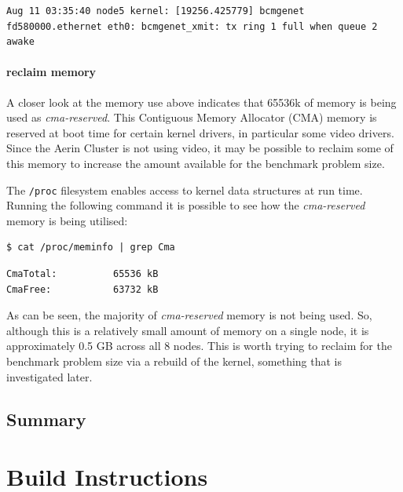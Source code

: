 \documentclass{report}
\begin{document}
\lstset{style=type}
\begin{lstlisting}
Aug 11 03:35:40 node5 kernel: [19256.425779] bcmgenet fd580000.ethernet eth0: bcmgenet_xmit: tx ring 1 full when queue 2 awake
\end{lstlisting}



%
%
\subsection{reclaim memory}
A closer look at the memory use above indicates that 65536k of memory is being used as \emph{cma-reserved}. This Contiguous Memory Allocator (CMA) memory is reserved at boot time for certain kernel drivers, in particular some video drivers. Since the Aerin Cluster is not using video, it may be possible to reclaim some of this memory to increase the amount available for the benchmark problem size.

The \verb|/proc| filesystem enables access to kernel data structures at run time. Running the following command it is possible to see how the \emph{cma-reserved} memory is being utilised:

\lstset{style=type}
\begin{lstlisting}
$ cat /proc/meminfo | grep Cma
\end{lstlisting}

\lstset{style=type}
\begin{lstlisting}
CmaTotal:          65536 kB
CmaFree:           63732 kB
\end{lstlisting}

As can be seen, the majority of \emph{cma-reserved} memory is not being used. So, although this is a relatively small amount of memory on a single node, it is approximately 0.5 GB across all 8 nodes. This is worth trying to reclaim for the benchmark problem size via a rebuild of the kernel, something that is investigated later.



%
%
\chapter{Summary}



%
%
\part{Build Instructions}

%
%
\end{document}
